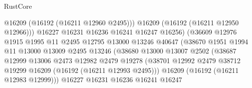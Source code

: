 \begin{lexlean}{RustCore}
\begin{coremodule}
                                          @16209
                                          (@16192 (@16211 @12960 @2495)))
                                        @16209
                                        (@16192 (@16211 @12950 @12966)))
                                      @16227
                                      @16231
                                      @16236
                                      @16241
                                      @16247
                                      @16256)
                                    (@36609
                                      @12976
                                      @1915
                                      @1995
                                      @11
                                      @2495
                                      @12795
                                      @13000
                                      @13246
                                      @40647
                                      (@38670
                                        @1951
                                        @1994
                                        @11
                                        @13000
                                        @13009
                                        @2495
                                        @13246
                                        (@38680
                                          @13000
                                          @13007
                                          @2502
                                          (@38687
                                            @12999
                                            @13006
                                            @2473
                                            @12982
                                            @2479
                                            @19278
                                            (@38701
                                              @12992
                                              @2479
                                              @38712
                                              @19299
                                              @16209
                                              (@16192 (@16211 @12993 @2495)))
                                            @16209
                                            (@16192 (@16211 @12983 @12999)))
                                          @16227
                                          @16231
                                          @16236
                                          @16241
                                          @16247

\end{coremodule}
\end{lexlean}
